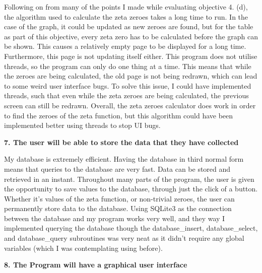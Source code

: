 \documentclass{article}
\begin{document}
Following on from many of the points I made while evaluating objective 4. (d), the algorithm used to calculate the zeta zeroes takes a long time to run. In the case of the graph, it could be updated as new zeroes are found, but for the table as part of this objective, every zeta zero has to be calculated before the graph can be shown. This causes a relatively empty page to be displayed for a long time. Furthermore, this page is not updating itself either. This program does not utilise threads, so the program can only do one thing at a time. This means that while the zeroes are being calculated, the old page is not being redrawn, which can lead to some weird user interface bugs. To solve this issue, I could have implemented threads, such that even while the zeta zeroes are being calculated, the previous screen can still be redrawn. Overall, the zeta zeroes calculator does work in order to find the zeroes of the zeta function, but this algorithm could have been implemented better using threads to stop UI bugs.


\textbf{7. The user will be able to store the data that they have collected}

My database is extremely efficient. Having the database in third normal form means that queries to the database are very fast. Data can be stored and retrieved in an instant. Throughout many parts of the program, the user is given the opportunity to save values to the database, through just the click of a button. Whether it's values of the zeta function, or non-trivial zeroes, the user can permanently store data to the database. Using SQLite3 as the connection between the database and my program works very well, and they way I implemented querying the database though the database\_insert, database\_select, and database\_query subroutines was very neat as it didn't require any global variables (which I was contemplating using before).


\textbf{8. The Program will have a graphical user interface}
\end{document}
